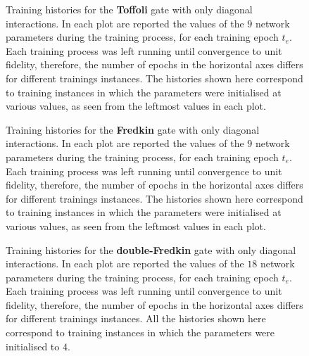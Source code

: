 \begin{figure}[htbp]
	\centering
	\caption{
		Training histories for the \textbf{Toffoli} gate with only diagonal interactions.
		In each plot are reported the values of the $9$ network parameters during the training process, for each training epoch $t_e$.
		Each training process was left running until convergence to unit fidelity, therefore, the number of epochs in the horizontal axes differs for different trainings instances.
		The histories shown here correspond to training instances in which the parameters were initialised at various values, as seen from the leftmost values in each plot.
	}
	\label{fig:toffoli_diagonal_parhistories}
\end{figure}

\begin{figure}[htbp]
	\centering
	\caption{
		Training histories for the \textbf{Fredkin} gate with only diagonal interactions.
		In each plot are reported the values of the $9$ network parameters during the training process, for each training epoch $t_e$.
		Each training process was left running until convergence to unit fidelity, therefore, the number of epochs in the horizontal axes differs for different trainings instances.
		The histories shown here correspond to training instances in which the parameters were initialised at various values, as seen from the leftmost values in each plot.
	}
	\label{fig:fredkin_diagonal_parhistories}
\end{figure}

\begin{figure}[htbp]
	\centering
	\caption{
		Training histories for the \textbf{double-Fredkin} gate with only diagonal interactions.
		In each plot are reported the values of the $18$ network parameters during the training process, for each training epoch $t_e$.
		Each training process was left running until convergence to unit fidelity, therefore, the number of epochs in the horizontal axes differs for different trainings instances.
		All the histories shown here correspond to training instances in which the parameters were initialised to $4$.
	}
	\label{fig:doublefredkin_diagonal_parhistories}
\end{figure}

